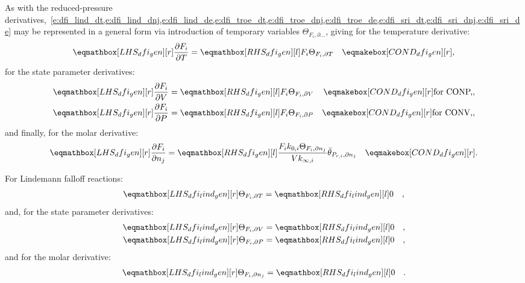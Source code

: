 \documentclass[12pt,number,sort&compress]{elsarticle}
\begin{document}
As with the reduced-pressure derivatives,~\cref{e:dfi_lind_dt,e:dfi_lind_dnj,e:dfi_lind_de,e:dfi_troe_dt,e:dfi_troe_dnj,e:dfi_troe_de,e:dfi_sri_dt,e:dfi_sri_dnj,e:dfi_sri_de} may be represented in a general form via introduction of temporary variables $\Theta_{F_i, \partial \ldots}$, giving for the temperature derivative:
\begin{align}
\lhs{dfi_gen}{\frac{\partial F_{i} }{\partial T }} &= \rhs{dfi_gen}{F_{i} \Theta_{F_i, \partial T}} & \cond{dfi_gen}{,}
\end{align}
for the state parameter derivatives:
\begin{subequations}
 \begin{align}
  \lhs{dfi_gen}{\frac{\partial F_{i} }{\partial V }} &= \rhs{dfi_gen}{F_{i} \Theta_{F_i, \partial V}} & \cond{dfi_gen}{\dconp/,} \\
  \lhs{dfi_gen}{\frac{\partial F_{i} }{\partial P }} &= \rhs{dfi_gen}{F_{i} \Theta_{F_i, \partial P}} & \cond{dfi_gen}{\dconv/,}
 \end{align}
\end{subequations}
and finally, for the molar derivative:
\begin{align}
 \lhs{dfi_gen}{\frac{\partial F_{i} }{\partial {n_j}}} &= \rhs{dfi_gen}{\frac{F_{i} k_{0, i} \Theta_{F_i, \partial n_j}}{V k_{\infty, i}} \bar{\theta}_{P_{r, i}, \partial n_j}} & \cond{dfi_gen}{.}
\end{align}

For Lindemann falloff reactions:
\begin{align}
\label{e:dfi_lind_dt_prod}
\lhs{dfi_lind_gen}{\Theta_{F_i, \partial T}} &= \rhs{dfi_lind_gen}{0} &,
\end{align}
and, for the state parameter derivatives:
\begin{subequations}
 \label{e:dfi_lind_de_prod}
 \begin{align}
  \lhs{dfi_lind_gen}{\Theta_{F_i, \partial V}} &= \rhs{dfi_lind_gen}{0} &, \\
  \lhs{dfi_lind_gen}{\Theta_{F_i, \partial P}} &= \rhs{dfi_lind_gen}{0} &,
 \end{align}
\end{subequations}
and for the molar derivative:
\begin{align}
\label{e:dfi_lind_dnj_prod}
\lhs{dfi_lind_gen}{\Theta_{F_i, \partial n_j}} &= \rhs{dfi_lind_gen}{0} &.
\end{align}
\end{document}
